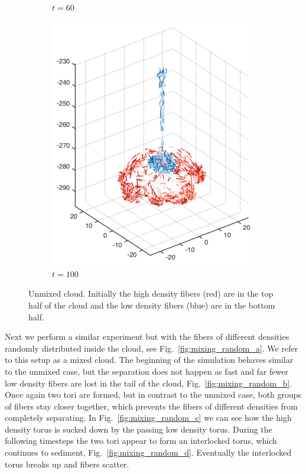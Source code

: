 \begin{figure}[htbp]
\begin{subfigure}[h]{0.24\textwidth}
    \caption{$t=60$}\label{fig:mixing_top_c}
  \end{subfigure}
  \begin{subfigure}[h]{0.24\textwidth}
    \centering
    \includegraphics[width=\textwidth]{img/mixing/top_00100.pdf}
    \caption{$t=100$}\label{fig:mixing_top_d}
  \end{subfigure}
  \caption[Unmixed cloud.]{Unmixed cloud. Initially the high density fibers (red) are in the top half of the cloud and the low density fibers (blue) are in the bottom half.}
  \label{fig:unmixed_sphere}
\end{figure}

Next we perform a similar experiment but with the fibers of different densities randomly distributed inside the cloud, see Fig.~\ref{fig:mixing_random_a}. We refer to this setup as a mixed cloud. The beginning of the simulation behaves similar to the unmixed case, but the separation does not happen as fast and far fewer low density fibers are lost in the tail of the cloud, Fig.~\ref{fig:mixing_random_b}. Once again two tori are formed, but in contrast to the unmixed case, both groups of fibers stay closer together, which prevents the fibers of different densities from completely separating. In Fig.~\ref{fig:mixing_random_c} we can see how the high density torus is sucked down by the passing low density torus. During the following timesteps the two tori appear to form an interlocked torus, which continues to sediment, Fig.~\ref{fig:mixing_random_d}. Eventually the interlocked torus breaks up and fibers scatter. 

